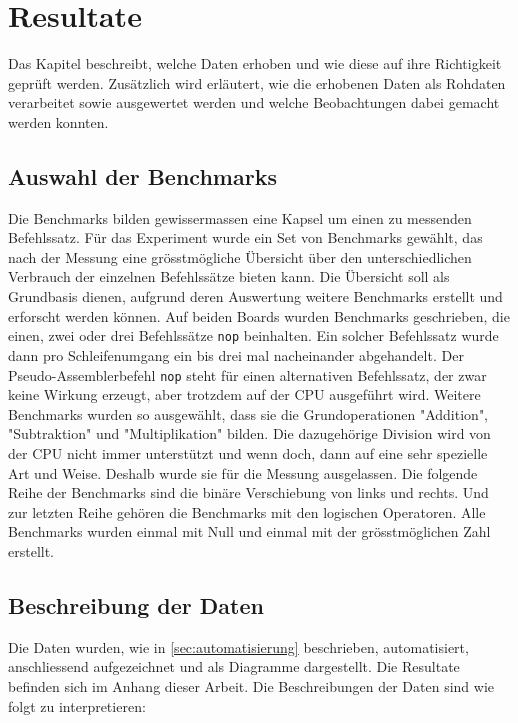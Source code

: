 \chapter{Resultate}

Das Kapitel beschreibt, welche Daten erhoben und wie diese auf ihre Richtigkeit geprüft werden. Zusätzlich wird erläutert, wie die erhobenen Daten als Rohdaten verarbeitet sowie ausgewertet werden und welche Beobachtungen dabei gemacht werden konnten.


\section{Auswahl der Benchmarks}

Die Benchmarks bilden gewissermassen eine Kapsel um einen zu messenden Befehlssatz. Für das Experiment wurde ein Set von Benchmarks gewählt, das nach der Messung eine grösstmögliche Übersicht über den unterschiedlichen Verbrauch der einzelnen Befehlssätze bieten kann. Die Übersicht soll als Grundbasis dienen, aufgrund deren Auswertung weitere Benchmarks erstellt und erforscht werden können. Auf beiden Boards wurden Benchmarks geschrieben, die einen, zwei oder drei Befehlssätze \texttt{nop} beinhalten. Ein solcher Befehlssatz wurde dann pro Schleifenumgang ein bis drei mal nacheinander abgehandelt. Der Pseudo-Assemblerbefehl \texttt{nop} steht für einen alternativen Befehlssatz, der zwar keine Wirkung erzeugt, aber trotzdem auf der CPU ausgeführt wird. Weitere Benchmarks wurden so ausgewählt, dass sie die Grundoperationen "Addition", "Subtraktion" und "Multiplikation" bilden. Die dazugehörige Division wird von der CPU nicht immer unterstützt und wenn doch, dann auf eine sehr spezielle Art und Weise. Deshalb wurde sie für die Messung ausgelassen. Die folgende Reihe der Benchmarks sind die binäre Verschiebung von links und rechts. Und zur letzten Reihe gehören die Benchmarks mit den logischen Operatoren. Alle Benchmarks wurden einmal mit Null und einmal mit der grösstmöglichen Zahl erstellt.




\section{Beschreibung der Daten}

Die Daten wurden, wie in \autoref{sec:automatisierung} beschrieben, automatisiert, anschliessend aufgezeichnet und als Diagramme dargestellt. Die Resultate befinden sich im Anhang dieser Arbeit. Die Beschreibungen der Daten sind wie folgt zu interpretieren:

